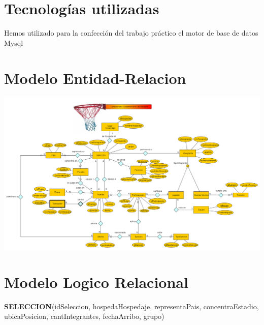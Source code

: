 \documentclass[11pt, a4paper, spanish]{article}
\newenvironment{borde}[1]
{\begin{lrbox}{\fmbox}\begin{minipage}{#1}}
{\end{minipage}\end{lrbox}\fbox{\usebox{\fmbox}}\\[10pt]}
\begin{document}


\newpage
\section{Tecnolog\'ias utilizadas}
Hemos utilizado para la confecci\'on del trabajo pr\'actico el motor de base de datos Mysql

\newpage
	
\section{Modelo Entidad-Relacion}

	\begin{center}
		\includegraphics[scale=0.35]{diagramas/DiagramaMER.png}\\
	\end{center}

\newpage 

\section{Modelo Logico Relacional}

\textbf{SELECCION}(idSeleccion, hospedaHospedaje, representaPais, concentraEstadio, ubicaPosicion, cantIntegrantes, fechaArribo, grupo)\\
\end{document}
